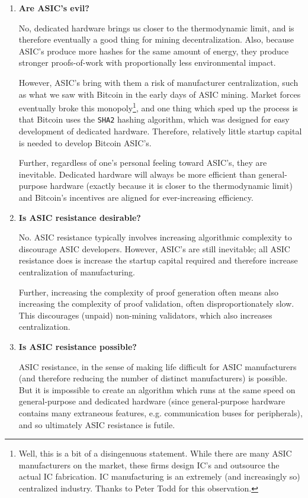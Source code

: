 \documentclass[letterpaper]{article}
\theoremstyle{xxx}
\theoremstyle{evil}
\theoremstyle{yyy}
\theoremstyle{plain}
\theoremstyle{zzz}
\begin{document}
\begin{enumerate}
\item \textbf{Are ASIC's evil?}

No, dedicated hardware brings us closer to the thermodynamic limit,
and is therefore eventually a good thing for mining decentralization.
Also, because ASIC's produce more hashes for the same amount of
energy, they produce stronger proofs-of-work with proportionally less
environmental impact.

However, ASIC's bring with them a risk of manufacturer centralization,
such as what we saw with Bitcoin in the early days of ASIC mining.
Market forces eventually broke this monopoly\footnote{Well, this is a
bit of a disingenuous statement. While there are many ASIC manufacturers
on the market, these firms design IC's and outsource the actual IC fabrication.
IC manufacturing is an extremely (and increasingly so) centralized industry.
Thanks to Peter Todd for this observation.}, 
and one thing which sped up the process is that Bitcoin uses the \texttt{SHA2}
hashing algorithm,
which was designed for easy development of dedicated hardware. Therefore,
relatively little startup capital is needed to develop Bitcoin ASIC's.

Further, regardless of one's personal feeling toward ASIC's, they
are inevitable. Dedicated hardware will always be more efficient
than general-purpose hardware (exactly because it is closer to the
thermodynamic limit) and Bitcoin's incentives are aligned for
ever-increasing efficiency.

\item \textbf{Is ASIC resistance desirable?}

No. ASIC resistance typically involves increasing algorithmic
complexity to discourage ASIC developers. However, ASIC's are
still inevitable; all ASIC resistance does is increase the
startup capital required and therefore increase centralization
of manufacturing.

Further, increasing the complexity of proof generation often means
also increasing the complexity of proof validation, often
disproportionately slow. This discourages (unpaid) non-mining
validators, which also increases centralization.

\item \textbf{Is ASIC resistance possible?}

ASIC resistance, in the sense of making life difficult for ASIC
manufacturers (and therefore reducing the number of distinct
manufacturers) is possible. But it is impossible to create
an algorithm which runs at the same speed on general-purpose and
dedicated hardware (since general-purpose hardware contains many
extraneous features, e.g. communication buses for peripherals),
and  so ultimately ASIC resistance is futile.


\end{enumerate}
\end{document}
